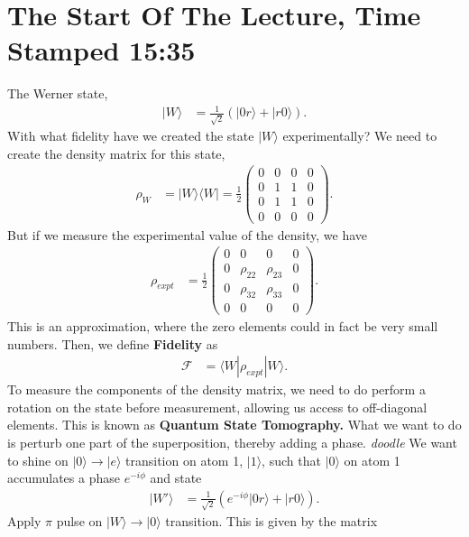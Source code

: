 \documentclass[a4paper, 11pt, normalem]{report}
\begin{document}
\section{The Start Of The Lecture, Time Stamped 15:35}
The Werner state,
\begin{align}
    |W\rangle &= \frac{1}{\sqrt{2}}\left(|0r\rangle + |r0\rangle\right).
\end{align}
With what fidelity have we created the state $|W\rangle$ experimentally?
We need to create the density matrix for this state,
\begin{align}
    \rho_W &= |W\rangle\langle W| = \frac12 \begin{pmatrix} 0 & 0 & 0 & 0 \\ 0 & 1 & 1 & 0 \\ 0 & 1 & 1 & 0 \\ 0 & 0 & 0 & 0 \end{pmatrix}.
\end{align}
But if we measure the experimental value of the density, we have
\begin{align}
    \rho_{expt} &= \frac12 \begin{pmatrix} 0 & 0 & 0 & 0 \\ 0 & \rho_{22} & \rho_{23} & 0 \\ 0 & \rho_{32} & \rho_{33} & 0 \\ 0 & 0 & 0 & 0 \end{pmatrix}.
\end{align}
This is an approximation, where the zero elements could in fact be very small numbers.
Then, we define \textbf{Fidelity} as
\begin{align}
    \mathcal{F} &= \langle W|\rho_{expt}|W\rangle.
\end{align}
To measure the components of the density matrix, we need to do perform a rotation on the state before measurement, allowing us access to off-diagonal elements.
This is known as \textbf{Quantum State Tomography.}
What we want to do is perturb one part of the superposition, thereby adding a phase.
\emph{doodle}
We want to shine on $|0\rangle\to|e\rangle$ transition on atom 1, $|1\rangle$, such that $|0\rangle$ on atom 1 accumulates a phase $e^{-i\phi}$ and state
\begin{align}
    |W'\rangle &= \frac{1}{\sqrt{2}}\left(e^{-i\phi}|0r\rangle + |r0\rangle\right).
\end{align}
Apply $\pi$ pulse on $|W\rangle\to|0\rangle$ transition.
This is given by the matrix
\end{document}
